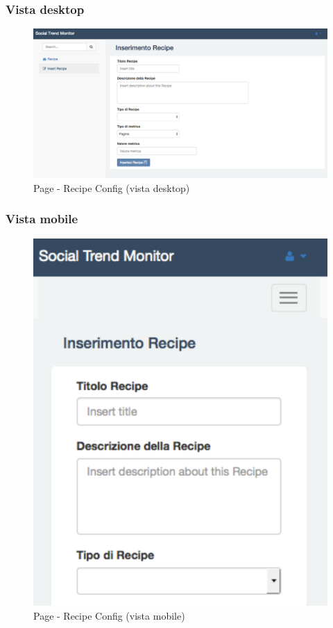 		\subsubsection{Vista desktop} %
		\begin{figure}[!h]
			\centering
			\centerline{\includegraphics[scale=0.4]{./images/mockup/recipe_config_vd.pdf}}
			\caption{Page - Recipe Config (vista desktop)}
		\end{figure}
\clearpage
		\subsubsection{Vista mobile} %
		\begin{figure}[!h]
			\centering
			\centerline{\includegraphics[scale=0.5]{./images/mockup/recipe_config_vm.pdf}}
			\caption{Page - Recipe Config (vista mobile)}
		\end{figure}


